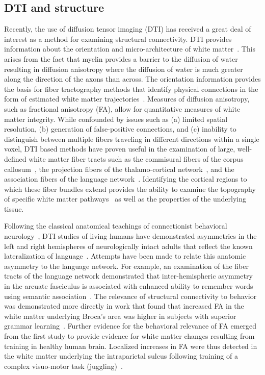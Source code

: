 \documentclass[final,authoryear,5p,times,twocolumn]{elsarticle}
\begin{document}
\subsection{DTI and structure}
Recently, the use of diffusion tensor imaging (DTI) has received a great deal of interest as a method for examining structural connectivity. DTI provides information about the orientation and micro-architecture of white matter~\cite{Basser1996}. This arises from the fact that myelin provides a barrier to the diffusion of water resulting in diffusion anisotropy where the diffusion of water is much greater along the direction of the axons than across. The orientation information provides the basis for fiber tractography methods that identify physical connections in the form of estimated white matter trajectories~\cite{Basser2000,Mori1999a}. Measures of diffusion anisotropy, such as fractional anisotropy (FA), allow for quantitative measures of white matter integrity.  While confounded by issues such as (a) limited spatial resolution, (b) generation of false-positive connections, and (c) inability to distinguish between multiple fibers traveling in different directions within a single voxel, DTI based methods have proven useful in the examination of large, well-defined white matter fiber tracts such as the commisural fibers of the corpus callosum~\cite{Sullivan2006,Goodlett2009a}, the projection fibers of the thalamo-cortical network~\cite{Behrens2003}, and the association fibers of the language network~\cite{Davis2009}. Identifying the cortical regions to which these fiber bundles extend provides the ability to examine the topography of specific white matter pathways~\cite{Behrens2003} as well as the properties of the underlying tissue. 

Following the classical anatomical teachings of connectionist behavioral neurology~\cite{Geschwind1965b,Geschwind1970}, DTI studies of living humans have demonstrated asymmetries in the left and right hemispheres of neurologically intact adults that reflect the known lateralization of language~\cite{Catani2008,Glasser2008}. Attempts have been made to relate this anatomic asymmetry to the language network. For example, an examination of the fiber tracts of the language network demonstrated that inter-hemispheric asymmetry in the arcuate fasciculus is associated with enhanced ability to remember words using semantic association~\cite{Catani2007}. The relevance of structural connectivity to behavior was demonstrated more directly in work that found that increased FA in the white matter underlying Broca's area was higher in subjects with superior grammar learning~\cite{Floel2009}. Further evidence for the behavioral relevance of FA emerged from the first study to provide evidence for white matter changes resulting from training in healthy human brain. Localized increases in FA were thus detected in the white matter underlying the intraparietal sulcus following training of a complex visuo-motor task (juggling)~\cite{Scholz2009}. 
\end{document}
